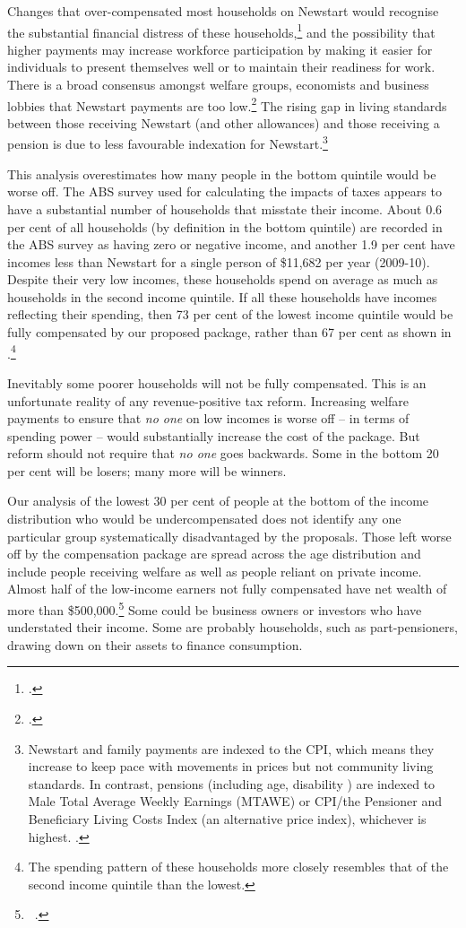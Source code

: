 Changes that over-compensated most households on Newstart would recognise the substantial financial distress of these households,\footcite[][18--19]{DaleyMcGannonEtAl2013}  and the possibility that higher payments may increase workforce participation by making it easier for individuals to present themselves well or to maintain their readiness for work.  There is a broad consensus amongst welfare groups, economists and business lobbies that Newstart payments are too low.\footcite[][3]{BCA2012}  The rising gap in living standards between those receiving Newstart (and other allowances) and those receiving a pension is due to less favourable indexation for Newstart.\footnote{Newstart and family payments are indexed to the CPI, which means they increase to keep pace with movements in prices but not community living standards. In contrast, pensions (including age, disability \etc) are indexed to Male Total Average Weekly Earnings (MTAWE) or CPI/the Pensioner and Beneficiary Living Costs Index (an alternative price index), whichever is highest. \textcite{DSS2015}. }  

This analysis overestimates how many people in the bottom quintile would be worse off. The ABS survey used for calculating the impacts of taxes appears to have a substantial number of households that misstate their income. About 0.6 per cent of all households (by definition in the bottom quintile) are recorded in the ABS survey as having zero or negative income, and another 1.9 per cent have incomes less than Newstart for a single person of \$11,682 per year (2009-10). Despite their very low incomes, these households spend on average as much as households in the second income quintile. If all these households have incomes reflecting their spending, then 73 per cent of the lowest income quintile would be fully compensated by our proposed package, rather than 67 per cent as shown in .\footnote{The spending pattern of these households more closely resembles that of the second income quintile than the lowest.}

Inevitably some poorer households will not be fully compensated. This is an unfortunate reality of any revenue-positive tax reform. Increasing welfare payments to ensure that \emph{no one} on low incomes is worse off – in terms of spending power – would substantially increase the cost of the package. But reform should not require that \emph{no one} goes backwards. Some in the bottom 20 per cent will be losers; many more will be winners. 

Our analysis of the lowest 30 per cent of people at the bottom of the income distribution who would be undercompensated does not identify any one particular group systematically disadvantaged by the proposals. Those left worse off by the compensation package are spread across the age distribution and include people receiving welfare as well as people reliant on private income. Almost half of the low-income earners not fully compensated have net wealth of more than \$500,000.\footnote{\gao\ \textcite{ABS2013-HES-2011-12-CURF}.}  Some could be business owners or investors who have understated their income. Some are probably households, such as part-pensioners, drawing down on their assets to finance consumption. 

